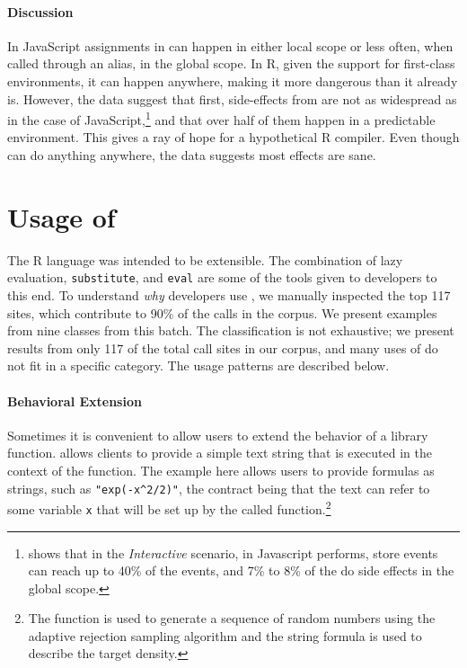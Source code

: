 \documentclass[acmsmall, screen]{acmart}
\renewcommand{\k}[1]{\lstinline |#1|\xspace}
\begin{document}
\paragraph{Discussion} In JavaScript assignments in \eval can happen in either
local scope or less often, when called through an alias, in the global scope.
In R, given the support for first-class environments, it can happen anywhere,
making it \eval more dangerous than it already is. However, the data suggest
that first, side-effects from \eval are not as widespread as in the case of
JavaScript,\footnote{\citep{ecoop11} shows that in the \emph{Interactive}
  scenario, \eval in Javascript performs, store events can reach up to 40\% of
the events, and 7\% to 8\% of the \eval do side effects in the global scope. }
and that over half of them happen in a predictable environment. This gives a
ray of hope for a hypothetical R compiler. Even though \eval can do anything
anywhere, the data suggests most effects are sane.

\section{Usage of \eval}

The R language was intended to be extensible. The combination of lazy
evaluation, \k{substitute}, and \k{eval} are some of the tools given to
developers to this end. To understand \emph{why} developers use \eval, we
manually inspected the top 117 sites, which contribute to 90\% of the calls in
the corpus. We present examples from nine classes from this batch. The
classification is not exhaustive; we present results from only 117 of the total
\PkgEvalCallSites call sites in our corpus, and many uses of \eval do not fit in
a specific category. The \eval usage patterns are described below.

\paragraph{Behavioral Extension} Sometimes it is convenient to allow users to
extend the behavior of a library function. \Eval allows clients to provide a
simple text string that is executed in the context of the function. The
example here allows users to provide formulas as strings, such as
\k{"exp(-x^2/2)"}, the contract being that the text can refer to some variable
\k{x} that will be set up by the called function.\footnote{The function is used
to generate a sequence of random numbers using the adaptive rejection sampling
algorithm and the string formula is used to describe the target density.}
\end{document}
